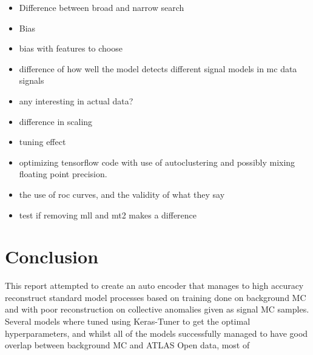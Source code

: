 \documentclass[ reprint, amsmath,amssymb, aps, nofootinbib]{revtex4-2}
\begin{document}



\begin{itemize}
    \item Difference between broad and narrow search
    \item Bias 
    \item bias with features to choose
    \item difference of how well the model detects different signal models in mc data signals
    \item any interesting in actual data?
    \item difference in scaling
    \item tuning effect
    \item optimizing tensorflow code with use of autoclustering and possibly mixing floating point precision. 
    \item the use of roc curves, and the validity of what they say
    \item test if removing mll and mt2 makes a difference
    
\end{itemize}


\section{Conclusion}
This report attempted to create an auto encoder that manages to high accuracy reconstruct standard model processes based on training done on background MC and with poor reconstruction on collective anomalies given as signal MC samples. Several models where tuned using Keras-Tuner to get the optimal hyperparameters, and whilst all of the models successfully managed to have good overlap between background MC and ATLAS Open data, most of 


\clearpage
\newpage
\mbox{~}
\onecolumngrid
\printbibliography

\newpage
\appendix
\end{document}
